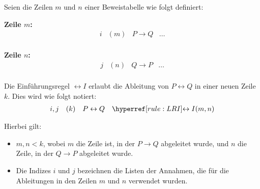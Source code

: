 \documentclass[main.tex]{subfiles}
\begin{document}
\begin{definition}
Seien die Zeilen \( m \) und \( n \) einer Beweistabelle wie folgt definiert:

\textbf{Zeile \( m \):}
\[
\begin{array}{llll}
    i & (m) & P \rightarrow Q & \dots \\
\end{array}
\]

\textbf{Zeile \( n \):}
\[
\begin{array}{llll}
    j & (n) & Q \rightarrow P & \dots \\
\end{array}
\]

Die Einführungsregel \(\leftrightarrow I\) erlaubt die Ableitung von \( P \leftrightarrow Q \) in einer neuen Zeile \( k \). Dies wird wie folgt notiert:
\[
\begin{array}{llll}
    i, j & (k) & P \leftrightarrow Q & \rLRI{m,n} \\
\end{array}
\]

Hierbei gilt:
\begin{itemize}
    \item \(m, n < k\), wobei \(m\) die Zeile ist, in der \(P \rightarrow Q\) abgeleitet wurde, und \(n\) die Zeile, in der \(Q \rightarrow P\) abgeleitet wurde.
    \item Die Indizes \( i \) und \( j \) bezeichnen die Listen der Annahmen, die für die Ableitungen in den Zeilen \( m \) und \( n \) verwendet wurden.
\end{itemize}

\end{definition}
\end{document}
